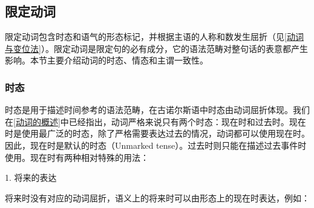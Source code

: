 {{\subsection{限定动词}\label{限定动词}

限定动词包含时态和语气的形态标记，并根据主语的人称和数发生屈折（见\ref{动词与变位法}）。限定动词是限定句的必有成分，它的语法范畴对整句话的表意都产生影响。本节主要介绍动词的时态、情态和主谓一致性。

\subsubsection{时态}\label{时态}

时态是用于描述时间参考的语法范畴，在古诺尔斯语中时态由动词屈折体现。我们在\ref{动词的概述}中已经指出，动词严格来说只有两个时态：现在时和过去时。现在时是使用最广泛的时态，除了严格需要表达过去的情况，动词都可以使用现在时。因此，现在时是默认的时态（Unmarked
tense）。过去时则只能在描述过去事件时使用。现在时有两种相对特殊的用法：

1. 将来的表达

将来时没有对应的动词屈折，语义上的将来时可以由形态上的现在时表达，例如：

}}
